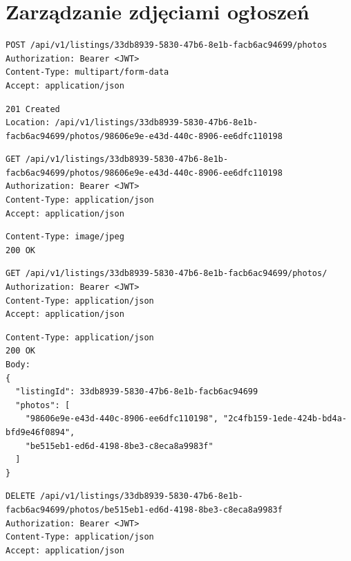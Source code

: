 \documentclass[11pt, a4paper]{article}
\begin{document}
\section{Zarządzanie zdjęciami ogłoszeń}
\begin{lstlisting}[style=http,caption={Żądanie HTTP - Dodanie Zdjęcia do ogłoszenia}]
POST /api/v1/listings/33db8939-5830-47b6-8e1b-facb6ac94699/photos
Authorization: Bearer <JWT>
Content-Type: multipart/form-data
Accept: application/json
\end{lstlisting}

\begin{lstlisting}[style=http,caption={Odpowiedź HTTP — sukces}]
201 Created
Location: /api/v1/listings/33db8939-5830-47b6-8e1b-facb6ac94699/photos/98606e9e-e43d-440c-8906-ee6dfc110198
\end{lstlisting}

\begin{lstlisting}[style=http,caption={Żądanie HTTP - Pobranie danego zdjęcia}]
GET /api/v1/listings/33db8939-5830-47b6-8e1b-facb6ac94699/photos/98606e9e-e43d-440c-8906-ee6dfc110198
Authorization: Bearer <JWT>
Content-Type: application/json
Accept: application/json
\end{lstlisting}

\begin{lstlisting}[style=http,caption={Odpowiedź HTTP — sukces}]
Content-Type: image/jpeg
200 OK
\end{lstlisting}

\begin{lstlisting}[style=http,caption={Żądanie HTTP - Wypisanie listy zdjęć danego ogłoszenia}]
GET /api/v1/listings/33db8939-5830-47b6-8e1b-facb6ac94699/photos/
Authorization: Bearer <JWT>
Content-Type: application/json
Accept: application/json
\end{lstlisting}

\begin{lstlisting}[style=http,caption={Odpowiedź HTTP — sukces}]
Content-Type: application/json
200 OK
Body:
{
  "listingId": 33db8939-5830-47b6-8e1b-facb6ac94699
  "photos": [
    "98606e9e-e43d-440c-8906-ee6dfc110198", "2c4fb159-1ede-424b-bd4a-bfd9e46f0894",
    "be515eb1-ed6d-4198-8be3-c8eca8a9983f"
  ]
}
\end{lstlisting}

\begin{lstlisting}[style=http,caption={Żądanie HTTP - Usunięcie danego zdjęcia}]
DELETE /api/v1/listings/33db8939-5830-47b6-8e1b-facb6ac94699/photos/be515eb1-ed6d-4198-8be3-c8eca8a9983f
Authorization: Bearer <JWT>
Content-Type: application/json
Accept: application/json
\end{lstlisting}
\end{document}
